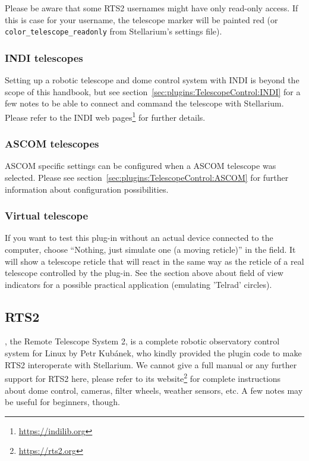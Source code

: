 Please be aware that some RTS2 usernames might have only read-only access. If this is
case for your username, the telescope marker will be painted red (or
\texttt{color\_telescope\_readonly} from Stellarium's settings file).

\subsubsection{INDI telescopes}
Setting up a robotic telescope and dome control system with INDI 
is beyond the scope of this handbook, but see section~\ref{sec:plugins:TelescopeControl:INDI} 
for a few notes to be able to connect and command the telescope with Stellarium.
Please refer to the INDI web pages\footnote{\url{https://indilib.org}} for further details.

\subsubsection{ASCOM telescopes}
ASCOM specific settings can be configured when a ASCOM telescope was selected.
Please see section~\ref{sec:plugins:TelescopeControl:ASCOM} for further information about
configuration possibilities.

\subsubsection{Virtual telescope}
If you want to test this plug-in without an actual device connected to
the computer, choose ``Nothing, just simulate one (a moving reticle)'' in
the  field. It will show a telescope reticle
that will react in the same way as the reticle of a real telescope
controlled by the plug-in.  See the section above about field of view
indicators for a possible practical application (emulating 'Telrad'
circles).  



\subsection{RTS2}
\label{sec:plugins:TelescopeControl:RTS2}

, the Remote Telescope System 2, is a complete robotic observatory control system for Linux 
by Petr Kub\'{a}nek, who kindly provided the plugin code to make RTS2 interoperate with Stellarium.
We cannot give a full manual or any further support for RTS2 here, please refer to its website\footnote{\url{https://rts2.org}} 
for complete instructions about dome control, cameras, filter wheels, weather sensors, etc. 
A few notes may be useful for beginners, though. 

